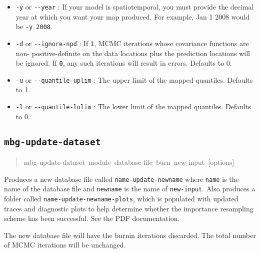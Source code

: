 \begin{itemize}
\item \texttt{-y} or \texttt{-{}-year} : If your model is spatiotemporal, you must provide the decimal year at
which you want your map produced. For example, Jan 1 2008 would be \texttt{-y 2008}.

\item \texttt{-d} or \texttt{-{}-ignore-npd} : If \texttt{1}, MCMC iterations whose covariance functions are non-
positive-definite on the data locations plus the prediction locations will be ignored. If
\texttt{0}, any such iterations will result in errors. Defaults to 0.

\item \texttt{-u} or \texttt{-{}-quantile-uplim} : The upper limit of the mapped quantiles. Defaults to 1.

\item \texttt{-l} or \texttt{-{}-quantile-lolim} : The lower limit of the mapped quantiles. Defaults to 0.

\end{itemize}




\subsection{\texttt{mbg-update-dataset}%
}
%
\begin{quote}{\ttfamily \raggedright \noindent
mbg-update-dataset~module~database-file~burn~new-input~{[}options{]}
}
\end{quote}

Produces a new database file called \texttt{name-update-newname} where \texttt{name} is the name
of the database file and \texttt{newname} is the name of \texttt{new-input}. Also produces a folder
called \texttt{name-update-newname-plots}, which is populated with updated traces and diagnostic
plots to help determine whether the importance resampling scheme has been successful. See
the PDF documentation.

The new database file will have the burnin iterations discarded. The total number of MCMC
iterations will be unchanged.




